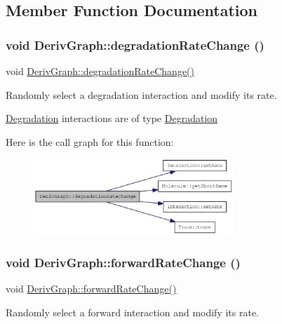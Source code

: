 \subsection{Member Function Documentation}
\hypertarget{classDerivGraph_a038841806aa1fe80a9450f977baa1fd2}{
\subsubsection[{degradationRateChange}]{\setlength{\rightskip}{0pt plus 5cm}void DerivGraph::degradationRateChange ()}}
\label{classDerivGraph_a038841806aa1fe80a9450f977baa1fd2}
void \hyperlink{classDerivGraph_a038841806aa1fe80a9450f977baa1fd2}{DerivGraph::degradationRateChange()}

Randomly select a degradation interaction and modify its rate.

\hyperlink{classDegradation}{Degradation} interactions are of type \hyperlink{classDegradation}{Degradation} 

Here is the call graph for this function:\nopagebreak
\begin{figure}[H]
\begin{center}
\leavevmode
\includegraphics[width=214pt]{classDerivGraph_a038841806aa1fe80a9450f977baa1fd2_cgraph}
\end{center}
\end{figure}
\hypertarget{classDerivGraph_afbda567a3f51d05fad37eb46fc121a89}{
\subsubsection[{forwardRateChange}]{\setlength{\rightskip}{0pt plus 5cm}void DerivGraph::forwardRateChange ()}}
\label{classDerivGraph_afbda567a3f51d05fad37eb46fc121a89}
void \hyperlink{classDerivGraph_afbda567a3f51d05fad37eb46fc121a89}{DerivGraph::forwardRateChange()}

Randomly select a forward interaction and modify its rate.

